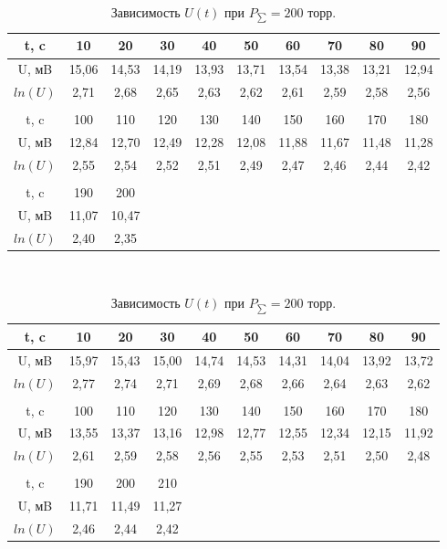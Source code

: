 \documentclass[a4paper,11.5pt]{article} %
\begin{document}
\begin{table}
	\caption{Зависимость $U(t)$ при $P_{\sum} = 150 $ торр.}
\begin{tabular}{| c | c | c | c | c | c | c | c | c | c |}
\hline
t, c & 10 & 20 & 30 & 40 & 50 & 60 & 70 & 80 & 90  \\ \hline
U, мB & 15,06 & 14,53 & 14,19 & 13,93 & 13,71 & 13,54 & 13,38 & 13,21 & 12,94  \\ \hline
$ln(U)$ & 2,71 & 2,68 & 2,65 & 2,63 & 2,62 & 2,61 & 2,59 & 2,58 & 2,56  \\ \hline
\\  \hline
t, c & 100 & 110 & 120 & 130 & 140 & 150 & 160 & 170 & 180    \\ \hline
U, мB & 12,84 & 12,70 & 12,49 & 12,28 & 12,08 & 11,88 & 11,67 & 11,48 & 11,28  \\ \hline
$ln(U)$ & 2,55 & 2,54 & 2,52 & 2,51 & 2,49 & 2,47 & 2,46 & 2,44 & 2,42 \\ \hline
\\  \hline
t, c & 190 & 200 &&&&&&&\\ \hline
U, мB & 11,07 & 10,47 &&&&&&&\\ \hline
$ln(U)$  & 2,40 & 2,35 &&&&&&&\\ \hline
\end{tabular}\\

	\caption{Зависимость $U(t)$ при $P_{\sum} = 200 $ торр.}
\begin{tabular}{| c | c | c | c | c | c | c | c | c | c |}
\hline
t, c & 10 & 20 & 30 & 40 & 50 & 60 & 70 & 80 & 90 \\ \hline
U, мB & 15,97 & 15,43 & 15,00 & 14,74 & 14,53 & 14,31 & 14,04 & 13,92 & 13,72  \\ \hline
$ln(U)$ & 2,77 & 2,74 & 2,71 & 2,69 & 2,68 & 2,66 & 2,64 & 2,63 & 2,62   \\ \hline
\\  \hline
t, c & 100 & 110 & 120 & 130 & 140 & 150 & 160 & 170 & 180    \\ \hline
U, мB & 13,55 & 13,37 & 13,16 & 12,98 & 12,77 & 12,55 & 12,34 & 12,15 & 11,92   \\ \hline
$ln(U)$ & 2,61 & 2,59 & 2,58 & 2,56 & 2,55 & 2,53 & 2,51 & 2,50 & 2,48  \\ \hline
\\  \hline
t, c & 190 & 200 & 210 &&&&&&\\ \hline
U, мB & 11,71 & 11,49 & 11,27 &&&&&&\\ \hline
$ln(U)$ & 2,46 & 2,44 & 2,42 &&&&&&\\ \hline
\end{tabular}\\


\end{table}
\end{document}

